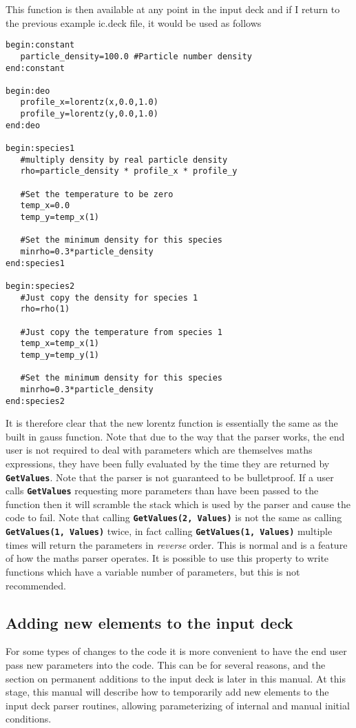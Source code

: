\documentclass[12pt,a4paper]{article}
\newcommand{\simpleboxverbatim}{\begin{Verbatim}[obeytabs=true,frame=single,
  framerule=0.5mm,rulecolor=\color{warwickmid},formatcom=\color{black}]}
\newcommand{\inlinecode}[1]{{\color{warwickred} \bf\texttt{#1}}}
\begin{document}
This function is then available at any point in the input deck and if I return
to the previous example ic.deck file, it would be used as follows

\simpleboxverbatim
begin:constant
   particle_density=100.0 #Particle number density
end:constant

begin:deo
   profile_x=lorentz(x,0.0,1.0)
   profile_y=lorentz(y,0.0,1.0)
end:deo

begin:species1
   #multiply density by real particle density
   rho=particle_density * profile_x * profile_y

   #Set the temperature to be zero
   temp_x=0.0
   temp_y=temp_x(1)

   #Set the minimum density for this species
   minrho=0.3*particle_density
end:species1

begin:species2
   #Just copy the density for species 1
   rho=rho(1)

   #Just copy the temperature from species 1
   temp_x=temp_x(1)
   temp_y=temp_y(1)

   #Set the minimum density for this species
   minrho=0.3*particle_density
end:species2
\end{Verbatim}

It is therefore clear that the new lorentz function is essentially the same as
the built in gauss function. Note that due to the way that the parser works,
the end user is not required to deal with parameters which are themselves
maths expressions, they have been fully evaluated by the time they are
returned by \inlinecode{GetValues}. Note that the parser is not guaranteed to
be bulletproof. If a user calls \inlinecode{GetValues} requesting more
parameters than have been passed to the function then it will scramble the
stack which is used by the parser and cause the code to fail. Note that
calling \inlinecode{GetValues(2, Values)} is not the same as calling
\inlinecode{GetValues(1, Values)} twice, in fact calling
\inlinecode{GetValues(1, Values)} multiple times will return the parameters in
{\it reverse} order. This is normal and is a feature of how the maths parser
operates. It is possible to use this property to write functions which have a
variable number of parameters, but this is not recommended.

\subsection{Adding new elements to the input deck}

For some types of changes to the code it is more convenient to have the end
user pass new parameters into the code. This can be for several reasons, and
the section on permanent additions to the input deck is later in this
manual. At this stage, this manual will describe how to temporarily add new
elements to the input deck parser routines, allowing parameterizing of
internal and manual initial conditions.
\end{document}
